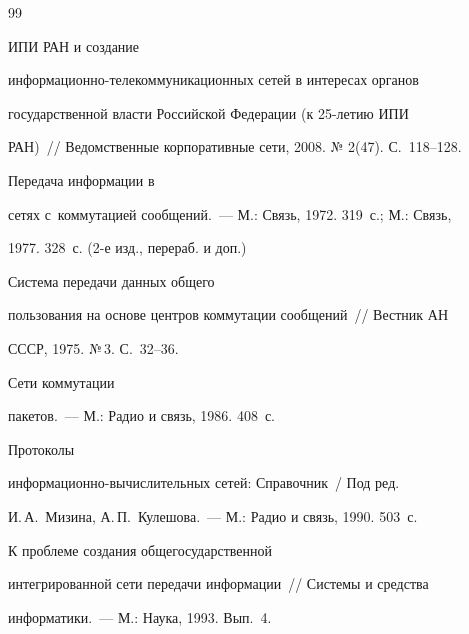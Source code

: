 {\small\frenchspacing

{%


\begin{thebibliography}{99}




 ИПИ РАН и создание 

ин\-фор\-ма\-ци\-он\-но-телекоммуникационных сетей в интересах органов 

государственной власти Российской Федерации (к 25-летию ИПИ 

РАН)~/\!\!/ Ведомственные корпоративные сети, 2008. № 2(47). С.~118--128. 


 Передача информации в 

сетях с~коммутацией сообщений.~--- М.: Связь, 1972. 319~с.;  М.: Связь, 

1977. 328~с. (2-е изд., перераб. и доп.) 




 Система передачи данных общего 

пользования на основе центров коммутации сообщений~/\!\!/  Вестник АН 

СССР, 1975. №\,3. С.~32--36.


 Сети коммутации 

пакетов.~--- М.: Радио и связь, 1986. 408~с.


 Протоколы 

информационно-вы\-чис\-ли\-тель\-ных сетей: Справочник~/ Под ред. 

И.\,А.~Мизина, А.\,П.~Кулешова.~--- М.: Радио и связь, 1990. 503~с.




 К проблеме создания общегосударственной 

интегрированной сети передачи информации~/\!\!/  Системы и средства 

информатики.~---  М.: Наука, 1993. Вып.~4.


\end{thebibliography}}}
